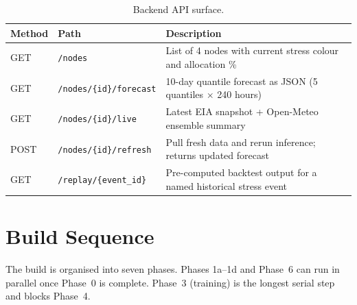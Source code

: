 \documentclass[10pt,letterpaper]{article}
\begin{document}
\begin{table}[H]
\centering
\caption{Backend API surface.}
\label{tab:api}
\renewcommand{\arraystretch}{1.25}
\begin{tabularx}{\linewidth}{@{}llX@{}}
\toprule
\textbf{Method} & \textbf{Path} & \textbf{Description} \\
\midrule
GET  & \texttt{/nodes}                       & List of 4 nodes with current
                                               stress colour and allocation \% \\
GET  & \texttt{/nodes/\{id\}/forecast}       & 10-day quantile forecast as JSON
                                               (5 quantiles $\times$ 240 hours) \\
GET  & \texttt{/nodes/\{id\}/live}           & Latest EIA snapshot +
                                               Open-Meteo ensemble summary \\
POST & \texttt{/nodes/\{id\}/refresh}        & Pull fresh data and rerun
                                               inference; returns updated forecast \\
GET  & \texttt{/replay/\{event\_id\}}        & Pre-computed backtest output for
                                               a named historical stress event \\
\bottomrule
\end{tabularx}
\end{table}

\section{Build Sequence}

The build is organised into seven phases. Phases 1a--1d and Phase~6 can run in parallel
once Phase~0 is complete. Phase~3 (training) is the longest serial step and blocks
Phase~4.
\end{document}
